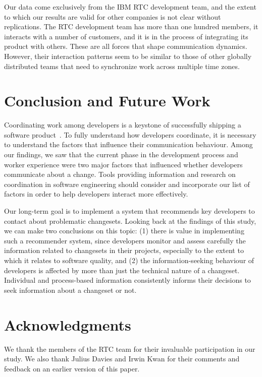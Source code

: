 \documentclass{sig-alternate}
\begin{document}
Our data come exclusively from the IBM RTC development team, and the extent to which our results are valid for other companies is not clear without replications. 
The RTC development team has more than one hundred members, it interacts with a number of customers, and it is in the process of integrating its product with others.
These are all forces that shape communication dynamics. 
However, their interaction patterns seem to be similar to those of other globally distributed teams that need to synchronize work across multiple time zones.

\section{Conclusion and Future Work}
\label{sec:conclusions}

Coordinating work among developers is a keystone of successfully shipping a software product~\cite{herbsleb:icse:2001,kraut:cacm:1995}. To fully understand how developers coordinate, it is necessary to understand the factors that influence their communication behaviour. Among our findings, we saw that the current phase in the development process and worker experience were two  major factors that influenced whether developers communicate about a change. Tools providing information and research on coordination in software engineering should consider and incorporate our list of factors in order to help developers interact more effectively.

Our long-term goal is to implement a system that recommends key developers to contact about problematic changesets. Looking back at the findings of this study, we can make two conclusions on this topic:
(1) there is value in implementing such a recommender system, since developers monitor and assess carefully the information related to changesets in their projects, especially to the extent to which it relates to software quality, and 
(2) the information-seeking behaviour of developers is affected by more than just the technical nature of a changeset. Individual and process-based information consistently informs their decisions to seek information about a changeset or not.



\section{Acknowledgments}

We thank the members of the RTC team for their invaluable participation in our study. We also thank Julius Davies and Irwin Kwan for their comments and feedback on an earlier version of this paper.

%

%
%
\end{document}
